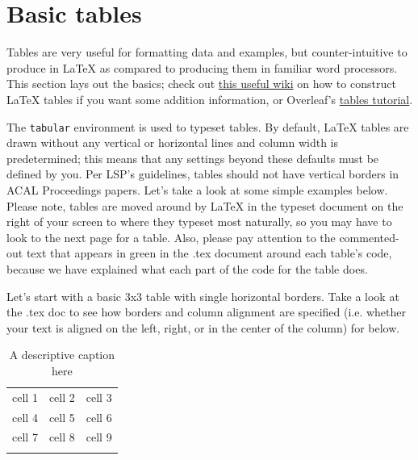 \documentclass[output=paper,colorlinks,citecolor=brown,
]{langscibook}
\begin{document}
\section{Basic tables} \label{sec:diercks:BasicTables}

Tables are very useful for formatting data and examples, but counter-intuitive to produce in \LaTeX{} as compared to producing them in familiar word processors. This section lays out the basics; check out \href{https://en.wikibooks.org/wiki/LaTeX/Tables}{this useful wiki} on how to construct \LaTeX{} tables if you want some addition information, or Overleaf's  \href{https://www.overleaf.com/learn/latex/Tables}{tables tutorial}.

The \texttt{tabular} environment is used to typeset tables. By default, \LaTeX{} tables are drawn without any vertical or horizontal lines and column width is predetermined; this means that any settings beyond these defaults must be defined by you. Per LSP's guidelines, tables should not have vertical borders in ACAL Proceedings papers. Let's take a look at some simple examples below. Please note, tables are moved around by \LaTeX{} in the typeset document on the right of your screen to where they typeset most naturally, so you may have to look to the next page for a table. Also, please pay attention to the commented-out text that appears in green in the .tex document around each table's code, because we have explained what each part of the code for the table does.   %


Let's start with a basic 3x3 table with single horizontal borders. Take a look at the .tex doc to see how borders and column alignment are specified (i.e. whether your text is aligned on the left, right, or in the center of the column) for  below. 

\begin{table}

\caption{A descriptive caption here}
\label{tab:diercks:FirstSampleTable}

\begin{tabular}{lll} %
\lsptoprule %
cell 1 & cell 2 & cell 3 \\ 
cell 4 & cell 5 & cell 6 \\
cell 7 & cell 8 & cell 9 \\
\lspbottomrule %
\end{tabular}

\end{table}
\end{document}
